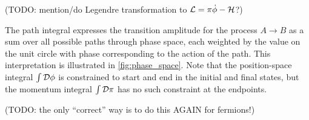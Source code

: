 (TODO: mention/do Legendre transformation to $\mathcal{L} = \pi \dot{\phi} - \mathcal{H}$?)

\iffalse
Note that the combination of the Hamiltonian and the fields in the exponential is precisely the Legendre transformation that converts between the Hamiltonian density $\ham$ and the Lagrangian density $\lagr$.
Thus, we might as well express the transition amplitude as the \textbf{path integral}
\begin{equation}
	\transampl = \int \pathintdif \pi \int_{\phi_A(\vec{x})}^{\phi_B(\vec{x})} \pathintdif \phi \, \exp \big( i S \left[ \pi(\vec{x}, t), \phi(\vec{x}, t) \right] / \hbar \big) ,
\label{eq:tft:path_integral_lagrangian}
\end{equation}
with the action
\begin{equation}
	S \left[ \pi(\vec{x}, t), \phi(\vec{x}, t) \right] = \int_0^T \dif t \int \dif^3 x \, \lagr \left( \pi(\vec{x}, t), \phi(\vec{x}, t) \right) . \qquad \text{TODO: factor $c$?}
\label{eq:tft:action}
\end{equation}
\fi
The path integral expresses the transition amplitude for the process $A \rightarrow B$ as a sum over all possible paths through phase space, each weighted by the value on the unit circle with phase corresponding to the action of the path.
This interpretation is illustrated in \cref{fig:phase_space}.
Note that the position-space integral $\int \mathcal{D} \phi$ is constrained to start and end in the initial and final states, but the momentum integral $\int \mathcal{D} \pi$ has no such constraint at the endpoints.

(TODO: the only ``correct'' way is to do this AGAIN for fermions!)

